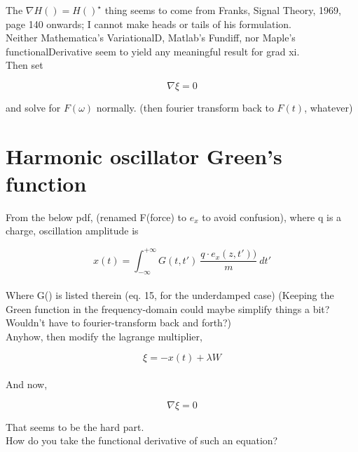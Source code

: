 \documentclass[]{article}
\begin{document}
The $\nabla H() = H()^\star$ thing seems to come from Franks, Signal Theory, 1969, page 140 onwards; I cannot make heads or tails of his formulation. \\

Neither Mathematica's VariationalD, Matlab's Fundiff, nor Maple's functionalDerivative seem to yield any meaningful result for grad xi.\\



Then set

$$\nabla \xi = 0$$

and solve for $F(\omega)$ normally. (then fourier transform back to $F(t)$, whatever)


\section{Harmonic oscillator Green's function}

From the below pdf, (renamed F(force) to $e_x$ to avoid confusion), where q is a charge, oscillation amplitude is


$$x(t) = \int_{-\infty}^{+\infty}{G(t,t')\ \frac{q\cdot e_x(z,t'))}{m}\ } dt'$$\\

Where G() is listed therein (eq. 15, for the underdamped case) (Keeping the Green function in the frequency-domain could maybe simplify things a bit? Wouldn't have to fourier-transform back and forth?)\\

Anyhow, then modify the lagrange multiplier,

$$\xi = -x(t) + \lambda W$$\\

And now,

$$\nabla \xi = 0$$

That seems to be the hard part.\\

How do you take the functional derivative of such an equation?





\end{document}
